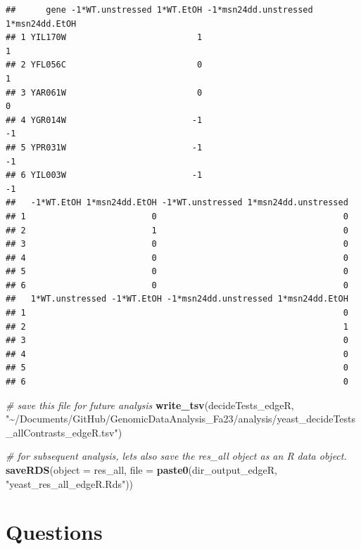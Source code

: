 \documentclass[
]{book}
\newenvironment{Shaded}{\begin{snugshade}}{\end{snugshade}}
\newcommand{\AttributeTok}[1]{\textcolor[rgb]{0.13,0.29,0.53}{#1}}
\newcommand{\CommentTok}[1]{\textcolor[rgb]{0.56,0.35,0.01}{\textit{#1}}}
\newcommand{\FunctionTok}[1]{\textcolor[rgb]{0.13,0.29,0.53}{\textbf{#1}}}
\newcommand{\NormalTok}[1]{#1}
\newcommand{\StringTok}[1]{\textcolor[rgb]{0.31,0.60,0.02}{#1}}
\begin{document}
\begin{verbatim}
##      gene -1*WT.unstressed 1*WT.EtOH -1*msn24dd.unstressed 1*msn24dd.EtOH
## 1 YIL170W                          1                                    1
## 2 YFL056C                          0                                    1
## 3 YAR061W                          0                                    0
## 4 YGR014W                         -1                                   -1
## 5 YPR031W                         -1                                   -1
## 6 YIL003W                         -1                                   -1
##   -1*WT.EtOH 1*msn24dd.EtOH -1*WT.unstressed 1*msn24dd.unstressed
## 1                         0                                     0
## 2                         1                                     0
## 3                         0                                     0
## 4                         0                                     0
## 5                         0                                     0
## 6                         0                                     0
##   1*WT.unstressed -1*WT.EtOH -1*msn24dd.unstressed 1*msn24dd.EtOH
## 1                                                               0
## 2                                                               1
## 3                                                               0
## 4                                                               0
## 5                                                               0
## 6                                                               0
\end{verbatim}

\begin{Shaded}
\begin{Highlighting}[]
\CommentTok{\# save this file for future analysis}
\FunctionTok{write\_tsv}\NormalTok{(decideTests\_edgeR, }\StringTok{"\textasciitilde{}/Documents/GitHub/GenomicDataAnalysis\_Fa23/analysis/yeast\_decideTests\_allContrasts\_edgeR.tsv"}\NormalTok{)}

\CommentTok{\# for subsequent analysis, let\textquotesingle{}s also save the res\_all object as an R data object.}
\FunctionTok{saveRDS}\NormalTok{(}\AttributeTok{object =}\NormalTok{ res\_all, }\AttributeTok{file =} \FunctionTok{paste0}\NormalTok{(dir\_output\_edgeR, }\StringTok{"yeast\_res\_all\_edgeR.Rds"}\NormalTok{))}
\end{Highlighting}
\end{Shaded}

\hypertarget{questions-3}{%
\section{Questions}\label{questions-3}}
\end{document}
